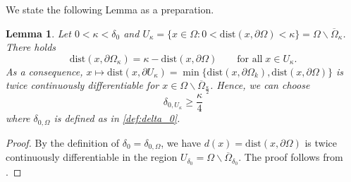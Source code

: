 \documentclass[12pt,reqno]{amsart}
\numberwithin{figure}{section}
\theoremstyle{plain}
\newtheorem{lem}[thm]{Lemma}
\theoremstyle{remark}
\numberwithin{equation}{section}
\begin{document}
We state the following Lemma as a preparation.

\begin{lem} Let $0<\kappa < \delta_0$ and $U_\kappa = \big\{x\in \Omega: 0<\mathrm{dist}(x,\partial\Omega) < \kappa\big\} = \Omega\backslash \overline{\Omega}_\kappa$. There holds
\begin{equation*}
    \mathrm{dist}(x,\partial\Omega_\kappa) = \kappa - \mathrm{dist}(x,\partial\Omega) \qquad\text{for all}\;x\in U_\kappa.
\end{equation*}
As a consequence, $x\mapsto \mathrm{dist}(x,\partial U_\kappa) = \min\big\{\mathrm{dist}(x,\partial \Omega_k),\mathrm{dist}(x,\partial \Omega)\big\}$ is twice continuously differentiable for $x\in \Omega\backslash \overline{\Omega}_{\frac{\kappa}{2}}$. Hence, we can choose 
\begin{equation}\label{e:delta_kappa}
    \delta_{0,U_\kappa} \geq \frac{\kappa}{4}
\end{equation}
where $\delta_{0,\Omega}$ is defined as in \eqref{def:delta_0}.
\end{lem}

\begin{proof} By the definition of $\delta_0 = \delta_{0,\Omega}$, we have $d(x) = \mathrm{dist}(x,\partial\Omega)$ is twice continuously differentiable in the region $U_{\delta_0} = \Omega\backslash \overline{\Omega}_{\delta_0}$. The proof follows from \cite[p. 355]{gilbarg_elliptic_2001}. 
\end{proof}

\end{document}
